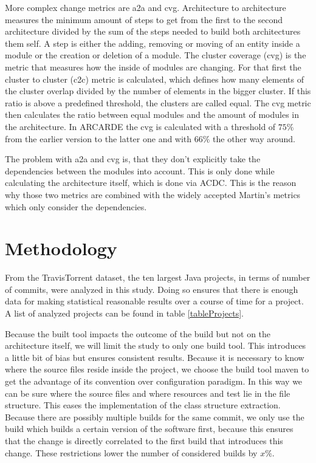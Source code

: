 \documentclass[conference]{IEEEtran}
\begin{document}
More complex change metrics are a2a and cvg. Architecture to architecture measures the minimum amount of steps to get from the first to the second architecture divided by the sum of the steps needed to build both architectures them self. A step is either the adding, removing or moving of an entity inside a module or the creation or deletion of a module. 
The cluster coverage (cvg) is the metric that measures how the inside of modules are changing. For that first the cluster to cluster (c2c) metric is calculated, which defines how many elements of the cluster overlap divided by the number of elements in the bigger cluster. If this ratio is above a predefined threshold, the clusters are called equal. The cvg metric then calculates the ratio between equal modules and the amount of modules in the architecture. In ARCARDE the cvg is calculated with a threshold of $75\%$ from the earlier version to the latter one and with $66\%$ the other way around. 

The problem with a2a and cvg is, that they don't explicitly take the dependencies between the modules into account. This is only done while calculating the architecture itself, which is done via ACDC. This is the reason why those two metrics are combined with the widely accepted Martin's metrics which only consider the dependencies.

\section{Methodology}

From the TravisTorrent dataset, the ten largest Java projects, in terms of number of commits, were analyzed in this study. Doing so ensures that there is enough data for making statistical reasonable results over a course of time for a project. A list of analyzed projects can be found in table \ref{tableProjects}.

Because the built tool impacts the outcome of the build but not on the architecture itself, we will limit the study to only one build tool. This introduces a little bit of bias but ensures consistent results. Because it is necessary to know where the source files reside inside the project, we choose the build tool maven to get the advantage of its convention over configuration paradigm. In this way we can be sure where the source files and where resources and test lie in the file structure. This eases the implementation of the class structure extraction. 
Because there are possibly multiple builds for the same commit, we only use the build which builds a certain version of the software first, because this ensures that the change is directly correlated to the first build that introduces this change. These restrictions lower the number of considered builds by $x\%$. 
\end{document}
